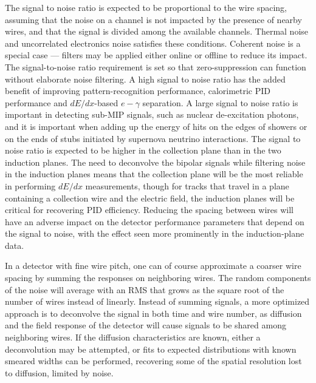 The signal to noise ratio is expected to be proportional to the wire
spacing, assuming that the noise on a channel is not impacted by the
presence of nearby wires, and that the signal is divided among the
available channels.  Thermal noise and uncorrelated electronics noise
satisfies these conditions.  Coherent noise is a special case ---
filters may be applied either online or offline to reduce its impact.
The signal-to-noise ratio requirement is set so that zero-suppression
can function without elaborate noise filtering.  A high signal to
noise ratio has the added benefit of improving pattern-recognition
performance, calorimetric PID performance and $dE/dx$-based
$e-\gamma$ separation.  A large signal to noise ratio is important in
detecting sub-MIP signals, such as nuclear de-excitation photons, and
it is important when adding up the energy of hits on the edges of
showers or on the ends of stubs initiated by supernova neutrino
interactions.  The signal to noise ratio is expected to be higher in
the collection plane than in the two induction planes.  The need to
deconvolve the bipolar signals while filtering noise in the induction
planes means that the collection plane will be the most reliable in
performing $dE/dx$ measurements, though for tracks that travel in a
plane containing a collection wire and the electric field, the
induction planes will be critical for recovering PID efficiency.
Reducing the spacing between wires will have an adverse impact on the
detector performance parameters that depend on the signal to noise,
with the effect seen more prominently in the induction-plane data.

In a detector with fine wire pitch, one can of course approximate a
coarser wire spacing by summing the responses on neighboring wires.
The random components of the noise will average with an RMS that grows
as the square root of the number of wires instead of linearly.
Instead of summing signals, a more optimized approach is to deconvolve
the signal in both time and wire number, as diffusion and the field
response of the detector will cause signals to be shared among
neighboring wires.  If the diffusion characteristics are known, either
a deconvolution may be attempted, or fits to expected distributions
with known smeared widths can be performed, recovering some of the
spatial resolution lost to diffusion, limited by noise.

